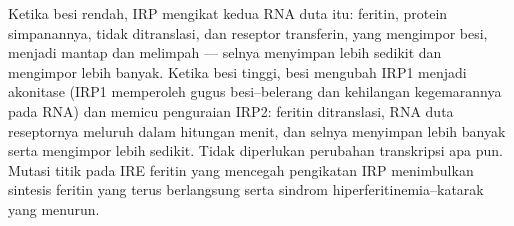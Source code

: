 \begin{example}\label{ex:b3:rna-regulation:iron}
Ketika besi rendah, IRP mengikat kedua RNA duta itu: feritin, protein
simpanannya, tidak ditranslasi, dan reseptor transferin, yang mengimpor besi,
menjadi mantap dan melimpah --- selnya menyimpan lebih sedikit dan mengimpor
lebih banyak. Ketika besi tinggi, besi mengubah IRP1 menjadi akonitase (IRP1
memperoleh gugus besi--belerang dan kehilangan kegemarannya pada RNA) dan
memicu penguraian IRP2: feritin ditranslasi, RNA duta reseptornya meluruh
dalam hitungan menit, dan selnya menyimpan lebih banyak serta mengimpor lebih
sedikit. Tidak diperlukan perubahan transkripsi apa pun. Mutasi titik pada IRE
feritin yang mencegah pengikatan IRP menimbulkan sintesis feritin yang terus
berlangsung serta sindrom hiperferitinemia--katarak yang menurun.
\end{example}

